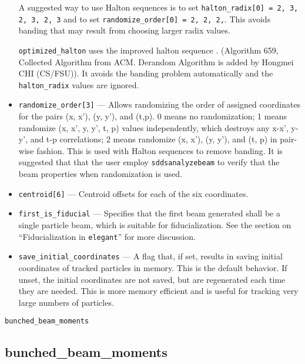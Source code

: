 \documentclass[11pt]{article}
\begin{document}
\begin{itemize}
A suggested way to use Halton sequences is to set
\verb|halton_radix[0] = 2, 3, 2, 3, 2, 3| and
to set 
\verb|randomize_order[0] = 2, 2, 2,|.  This avoids banding that may
result from choosing larger radix values.

\verb|optimized_halton| uses the improved halton sequence \cite{Chi2005}.
(Algorithm 659, Collected Algorithm from ACM. Derandom Algorithm is added
by Hongmei CHI (CS/FSU)). It avoids the banding problem automatically and
the \verb|halton_radix| values are ignored.

\item \verb|randomize_order[3]| --- Allows randomizing the order of
assigned coordinates for the pairs (x, x'), (y, y'), and (t,p).  0
means no randomization; 1 means randomize (x, x', y, y', t, p) values
independently, which destroys any x-x', y-y', and t-p correlations; 2
means randomize (x, x'), (y, y'), and (t, p) in pair-wise fashion.
This is used with Halton sequences to remove banding.  It is suggested
that that the user employ \verb|sddsanalyzebeam| to verify that the
beam properties when randomization is used.

\item \verb|centroid[6]| --- Centroid offsets for each of the six coordinates.

\item \verb|first_is_fiducial| --- Specifies that the first beam
generated shall be a single particle beam, which is suitable for
fiducialization.  See the section on ``Fiducialization in
\verb|elegant|'' for more discussion.

\item \verb|save_initial_coordinates| --- A flag that, if set, results
in saving initial coordinates of tracked particles in memory.  This is
the default behavior.  If unset, the initial coordinates are not
saved, but are regenerated each time they are needed.  This is more
memory efficient and is useful for tracking very large numbers of
particles.
\end{itemize}

\newpage
\begin{center}{\Large\verb|bunched_beam_moments|}\end{center}
\subsection{bunched\_beam\_moments \label{subsec:bunchedbeammoments}}
\end{document}
